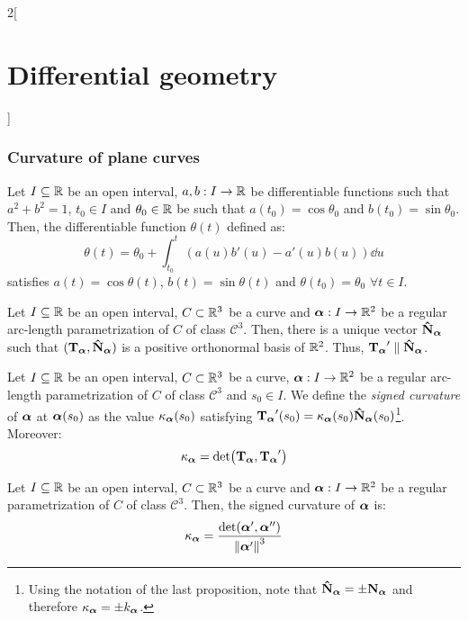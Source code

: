 \documentclass[../../../main_math.tex]{subfiles}
\begin{document}
\begin{multicols}{2}[\section{Differential geometry}]
  \subsubsection{Curvature of plane curves}
  \begin{lemma}
    Let $I\subseteq\mathbb{R}$ be an open interval, $a,b:I\rightarrow\mathbb{R}$ be differentiable functions such that $a^2+b^2=1$, $t_0\in I$ and $\theta_0\in\mathbb{R}$ be such that $a(t_0)=\cos\theta_0$ and $b(t_0)=\sin\theta_0$. Then, the differentiable function $\theta(t)$ defined as:
    $$\theta(t)=\theta_0+\int_{t_0}^t\left(a(u)b'(u)-a'(u)b(u)\right)\dd{u}$$
    satisfies $a(t)=\cos\theta(t)$, $b(t)=\sin\theta(t)$ and $\theta(t_0)=\theta_0$ $\forall t\in I$.
  \end{lemma}
  \begin{proposition}
    Let $I\subseteq\mathbb{R}$ be an open interval, $C\subset\mathbb{R}^3$ be a curve and $\boldsymbol{\mathrm{\alpha}}:I\rightarrow\mathbb{R}^2$ be a regular arc-length parametrization of $C$ of class $\mathcal{C}^3$. Then, there is a unique vector $\boldsymbol{\mathrm{\hat{N}}}_{\boldsymbol{\mathrm{\alpha}}}$ such that $({\boldsymbol{\mathrm{T}}_{\boldsymbol{\mathrm{\alpha}}}},\boldsymbol{\mathrm{\hat{N}}}_{\boldsymbol{\mathrm{\alpha}}})$ is a positive orthonormal basis of $\mathbb{R}^2$. Thus, ${\boldsymbol{\mathrm{T}}_{\boldsymbol{\mathrm{\alpha}}}}'\parallel \boldsymbol{\mathrm{\hat{N}}}_{\boldsymbol{\mathrm{\alpha}}}$.
  \end{proposition}
  \begin{definition}
    Let $I\subseteq\mathbb{R}$ be an open interval, $C\subset\mathbb{R}^3$ be a curve, $\boldsymbol{\mathrm{\alpha}}:I\rightarrow\mathbb{R}^2$ be a regular arc-length parametrization of $C$ of class $\mathcal{C}^3$ and $s_0\in I$. We define the \emph{signed curvature} of $\boldsymbol{\mathrm{\alpha}}$ at $\boldsymbol{\mathrm{\alpha}}(s_0)$ as the value ${\kappa_{\boldsymbol{\mathrm{\boldsymbol{\mathrm{\alpha}}}}}}(s_0)$ satisfying ${\boldsymbol{\mathrm{T}}_{\boldsymbol{\mathrm{\alpha}}}}'(s_0)={\kappa_{\boldsymbol{\mathrm{\boldsymbol{\mathrm{\alpha}}}}}}(s_0)\boldsymbol{\mathrm{\hat{N}}}_{\boldsymbol{\mathrm{\alpha}}}(s_0)$\footnote{Using the notation of the last proposition, note that $\boldsymbol{\mathrm{\hat{N}}}_{\boldsymbol{\mathrm{\alpha}}}=\pm{\boldsymbol{\mathrm{N}}_{\boldsymbol{\mathrm{\alpha}}}}$ and therefore ${\kappa_{\boldsymbol{\mathrm{\boldsymbol{\mathrm{\alpha}}}}}}=\pm k_{\boldsymbol{\mathrm{\alpha}}}$.}. Moreover: $${\kappa_{\boldsymbol{\mathrm{\boldsymbol{\mathrm{\alpha}}}}}}=\det({\boldsymbol{\mathrm{T}}_{\boldsymbol{\mathrm{\alpha}}}},{\boldsymbol{\mathrm{T}}_{\boldsymbol{\mathrm{\alpha}}}}')$$
  \end{definition}
  \begin{proposition}
    Let $I\subseteq\mathbb{R}$ be an open interval, $C\subset\mathbb{R}^3$ be a curve and $\boldsymbol{\mathrm{\alpha}}:I\rightarrow\mathbb{R}^2$ be a regular parametrization of $C$ of class $\mathcal{C}^3$. Then, the signed curvature of $\boldsymbol{\mathrm{\alpha}}$ is: $${\kappa_{\boldsymbol{\mathrm{\boldsymbol{\mathrm{\alpha}}}}}}=\frac{\det(\boldsymbol{\mathrm{\alpha}}',\boldsymbol{\mathrm{\alpha}}'')}{{\left\|\boldsymbol{\mathrm{\alpha}}'\right\|}^3}$$
  \end{proposition}

\end{multicols}
\end{document}
